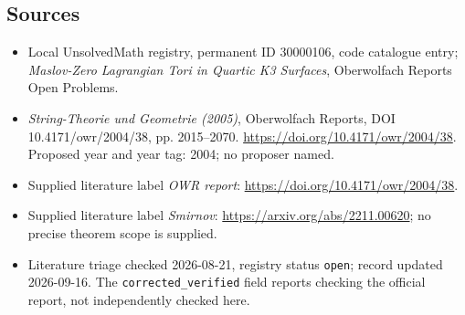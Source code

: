 \documentclass[11pt]{article}
\begin{document}
\subsection{Sources}
\begin{itemize}\item Local UnsolvedMath registry, permanent ID 30000106, code catalogue entry; \emph{Maslov-Zero Lagrangian Tori in Quartic K3 Surfaces}, Oberwolfach Reports Open Problems.\item \emph{String-Theorie und Geometrie (2005)}, Oberwolfach Reports, DOI 10.4171/owr/2004/38, pp. 2015--2070. \url{https://doi.org/10.4171/owr/2004/38}. Proposed year and year tag: 2004; no proposer named.\item Supplied literature label \emph{OWR report}: \url{https://doi.org/10.4171/owr/2004/38}.\item Supplied literature label \emph{Smirnov}: \url{https://arxiv.org/abs/2211.00620}; no precise theorem scope is supplied.\item Literature triage checked 2026-08-21, registry status \texttt{open}; record updated 2026-09-16. The \texttt{corrected\_verified} field reports checking the official report, not independently checked here.\end{itemize}
\end{document}
